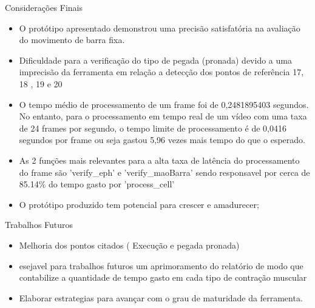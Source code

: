 \begin{frame}{Considerações Finais}
    \begin{itemize}
        \item O protótipo apresentado demonstrou uma precisão satisfatória na avaliação do movimento de barra fixa.
    
        \item Dificuldade para a verificação do tipo de pegada (pronada) devido a uma imprecisão da ferramenta em relação a detecção dos pontos de referência 17, 18 , 19 e 20
    
        \item O tempo médio de processamento de um frame foi de 0,2481895403 segundos. No entanto, para o processamento em tempo real de um vídeo com uma taxa de 24 frames por segundo, o tempo limite de processamento é de 0,0416 segundos por frame ou seja gastou 5,96 vezes mais tempo do que o esperado.
    
        \item As 2 funções mais relevantes para a alta taxa de latência do processamento do frame são ’verify\_eph’ e ’verify\_maoBarra’ sendo responsavel por cerca de 85.14\% do tempo gasto por ’process\_cell’
    
        \item O protótipo produzido tem potencial para crescer e amadurecer;
    \end{itemize}
\end{frame}

\begin{frame}{Trabalhos Futuros}
    \begin{itemize}
        \item Melhoria dos pontos citados ( Execução e pegada pronada)
        \item esejavel para trabalhos futuros um aprimoramento do relatório de modo que contabilize a quantidade de tempo gasto em cada tipo de contração muscular
        \item Elaborar estrategias para avançar com o grau de maturidade da ferramenta.
    \end{itemize}
\end{frame}
